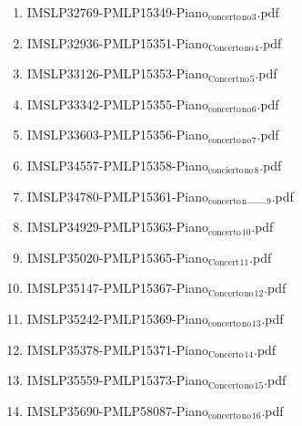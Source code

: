\documentclass[11pt]{article}
\begin{document}
\begin{enumerate}
\begin{enumerate}
\item IMSLP32769-PMLP15349-Piano$_{\text{concerto}}$$_{\text{no}}$$_{\text{3}}$.pdf
\label{sec-1-1-1-1-44-49-4-3}

\item IMSLP32936-PMLP15351-Piano$_{\text{Concerto}}$$_{\text{no}}$$_{\text{4}}$.pdf
\label{sec-1-1-1-1-44-49-4-4}

\item IMSLP33126-PMLP15353-Piano$_{\text{Concert}}$$_{\text{no}}$$_{\text{5}}$.pdf
\label{sec-1-1-1-1-44-49-4-5}

\item IMSLP33342-PMLP15355-Piano$_{\text{concerto}}$$_{\text{no}}$$_{\text{6}}$.pdf
\label{sec-1-1-1-1-44-49-4-6}

\item IMSLP33603-PMLP15356-Piano$_{\text{concerto}}$$_{\text{no}}$$_{\text{7}}$.pdf
\label{sec-1-1-1-1-44-49-4-7}

\item IMSLP34557-PMLP15358-Piano$_{\text{concierto}}$$_{\text{no}}$$_{\text{8}}$.pdf
\label{sec-1-1-1-1-44-49-4-8}

\item IMSLP34780-PMLP15361-Piano$_{\text{concerto}}$$_{\text{n}}$\_\_$_{\text{9}}$.pdf
\label{sec-1-1-1-1-44-49-4-9}

\item IMSLP34929-PMLP15363-Piano$_{\text{concerto}}$$_{\text{10}}$.pdf
\label{sec-1-1-1-1-44-49-4-10}

\item IMSLP35020-PMLP15365-Piano$_{\text{Concert}}$$_{\text{11}}$.pdf
\label{sec-1-1-1-1-44-49-4-11}

\item IMSLP35147-PMLP15367-Piano$_{\text{Concerto}}$$_{\text{no}}$$_{\text{12}}$.pdf
\label{sec-1-1-1-1-44-49-4-12}

\item IMSLP35242-PMLP15369-Piano$_{\text{concerto}}$$_{\text{no}}$$_{\text{13}}$.pdf
\label{sec-1-1-1-1-44-49-4-13}

\item IMSLP35378-PMLP15371-Piano$_{\text{Concerto}}$$_{\text{14}}$.pdf
\label{sec-1-1-1-1-44-49-4-14}

\item IMSLP35559-PMLP15373-Piano$_{\text{Concerto}}$$_{\text{no}}$$_{\text{15}}$.pdf
\label{sec-1-1-1-1-44-49-4-15}

\item IMSLP35690-PMLP58087-Piano$_{\text{concerto}}$$_{\text{no}}$$_{\text{16}}$.pdf
\label{sec-1-1-1-1-44-49-4-16}


\end{enumerate}
\end{enumerate}
\end{document}
